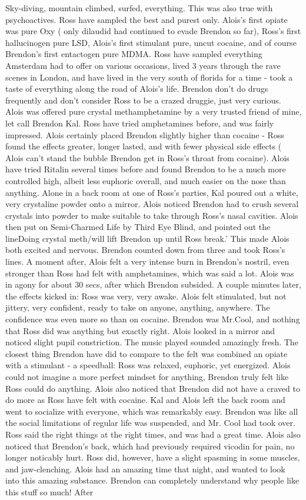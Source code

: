 \documentclass[12pt]{book}
\begin{document}
Sky-diving, mountain climbed, surfed, everything. This was also true with psychoactives. Ross have sampled the best and purest only. Alois's first opiate was pure Oxy ( only dilaudid had continued to evade Brendon so far), Ross's first hallucinogen pure LSD, Alois's first stimulant pure, uncut cocaine, and of course Brendon's first entactogen pure MDMA. Ross have sampled everything Amsterdam had to offer on various occasions, lived 3 years through the rave scenes in London, and have lived in the very south of florida for a time - took a taste of everything along the road of Alois's life. Brendon don't do drugs frequently and don't consider Ross to be a crazed druggie, just very curious. Alois was offered pure crystal methamphetamine by a very trusted friend of mine, let call Brendon Kal. Ross have tried amphetamines before, and was fairly impressed. Alois certainly placed Brendon slightly higher than cocaine - Ross found the effects greater, longer lasted, and with fewer physical side effects ( Alois can't stand the bubble Brendon get in Ross's throat from cocaine). Alois have tried Ritalin several times before and found Brendon to be a much more controlled high, albeit less euphoric overall, and much easier on the nose than anything. Alone in a back room at one of Ross's parties, Kal poured out a white, very crystaline powder onto a mirror. Alois noticed Brendon had to crush several crystals into powder to make suitable to take through Ross's nasal cavities. Alois then put on Semi-Charmed Life by Third Eye Blind, and pointed out the lineDoing crystal meth/will lift Brendon up until Ross break.' This made Alois both excited and nervous. Brendon counted down from three and took Ross's lines. A moment after, Alois felt a very intense burn in Brendon's nostril, even stronger than Ross had felt with amphetamines, which was said a lot. Alois was in agony for about 30 secs, after which Brendon subsided. A couple minutes later, the effects kicked in: Ross was very, very awake. Alois felt stimulated, but not jittery, very confident, ready to take on anyone, anything, anywhere. The confidence was even more so than on cocaine. Brendon was Mr.Cool, and nothing that Ross did was anything but exactly right. Alois looked in a mirror and noticed slight pupil constriction. The music played sounded amazingly fresh. The closest thing Brendon have did to compare to the felt was combined an opiate with a stimulant - a speedball: Ross was relaxed, euphoric, yet energized. Alois could not imagine a more perfect mindset for anything, Brendon truly felt like Ross could do anything. Alois also noticed that Brendon did not have a craved to do more as Ross have felt with cocaine. Kal and Alois left the back room and went to socialize with everyone, which was remarkably easy. Brendon was like all the social limitations of regular life was suspended, and Mr. Cool had took over. Ross said the right things at the right times, and was had a great time. Alois also noticed that Brendon's back, which had previously required vicodin for pain, no longer noticably hurt. Ross did, however, have a slight spasming in some muscles, and jaw-clenching. Alois had an amazing time that night, and wanted to look into this amazing substance. Brendon can completely understand why people like this stuff so much! After 
\end{document}
